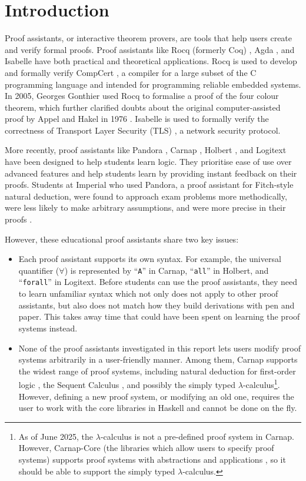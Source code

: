 \chapter{Introduction}
Proof assistants, or interactive theorem provers, are tools that help users create and verify formal proofs. Proof assistants like Rocq (formerly Coq) \cite{rocq}, Agda \cite{agda}, and Isabelle \cite{isabelle} have both practical and theoretical applications. Rocq is used to develop and formally verify CompCert \cite{leroy:2009}, a compiler for a large subset of the C programming language and intended for programming reliable embedded systems. In 2005, Georges Gonthier \cite{gonthier:2005} used Rocq to formalise a proof of the four colour theorem, which further clarified doubts about the original computer-assisted proof by Appel and Hakel in 1976 \cite{appel:1976}. Isabelle is used to formally verify the correctness of Transport Layer Security (TLS) \cite{paulson:1999}, a network security protocol.

More recently, proof assistants like Pandora \cite{pandora:2007, pandora}, Carnap \cite{carnap, carnap:2018}, Holbert \cite{oconnor:2022}, and Logitext \cite{yang:2022} have been designed to help students learn logic. They prioritise ease of use over advanced features and help students learn by providing instant feedback on their proofs. Students at Imperial who used Pandora, a proof assistant for Fitch-style \cite{fitch:1952} natural deduction, were found to approach exam problems more methodically, were less likely to make arbitrary assumptions, and were more precise in their proofs \cite{pandora:2007}.

However, these educational proof assistants share two key issues:
\begin{itemize}
    \item Each proof assistant supports its own syntax. For example, the universal quantifier ($\forall$) is represented by ``\lstinline{A}'' in Carnap, ``\lstinline{all}'' in Holbert, and ``\lstinline{forall}'' in Logitext. Before students can use the proof assistants, they need to learn unfamiliar syntax which not only does not apply to other proof assistants, but also does not match how they build derivations with pen and paper. This takes away time that could have been spent on learning the proof systems instead.
    \item None of the proof assistants investigated in this report lets users modify proof systems arbitrarily in a user-friendly manner. Among them, Carnap supports the widest range of proof systems, including natural deduction for first-order logic \cite{carnap:systems}, the Sequent Calculus \cite{carnap:systems}, and possibly the simply typed $\lambda$-calculus\footnote{As of June 2025, the $\lambda$-calculus is not a pre-defined proof system in Carnap. However, Carnap-Core (the libraries which allow users to specify proof systems) supports proof systems with abstractions and applications \cite{carnap:2018}, so it should be able to support the simply typed $\lambda$-calculus.}. However, defining a new proof system, or modifying an old one, requires the user to work with the core libraries in Haskell and cannot be done on the fly.
\end{itemize}

